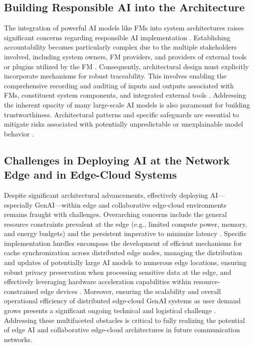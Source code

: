 \documentclass[sigconf]{acmart}
\begin{document}
\subsection{Building Responsible AI into the Architecture}

The integration of powerful AI models like FMs into system architectures raises significant concerns regarding responsible AI implementation \cite{ref16}. Establishing accountability becomes particularly complex due to the multiple stakeholders involved, including system owners, FM providers, and providers of external tools or plugins utilized by the FM \cite{ref16}. Consequently, architectural design must explicitly incorporate mechanisms for robust traceability. This involves enabling the comprehensive recording and auditing of inputs and outputs associated with FMs, constituent system components, and integrated external tools \cite{ref16}. Addressing the inherent opacity of many large-scale AI models is also paramount for building trustworthiness. Architectural patterns and specific safeguards are essential to mitigate risks associated with potentially unpredictable or unexplainable model behavior \cite{ref16}.

\subsection{Challenges in Deploying AI at the Network Edge and in Edge-Cloud Systems}

Despite significant architectural advancements, effectively deploying AI—especially GenAI—within edge and collaborative edge-cloud environments remains fraught with challenges. Overarching concerns include the general resource constraints prevalent at the edge (e.g., limited compute power, memory, and energy budgets) and the persistent imperative to minimize latency \cite{ref14,ref31}. Specific implementation hurdles encompass the development of efficient mechanisms for cache synchronization across distributed edge nodes, managing the distribution and updates of potentially large AI models to numerous edge locations, ensuring robust privacy preservation when processing sensitive data at the edge, and effectively leveraging hardware acceleration capabilities within resource-constrained edge devices \cite{ref3}. Moreover, ensuring the scalability and overall operational efficiency of distributed edge-cloud GenAI systems as user demand grows presents a significant ongoing technical and logistical challenge \cite{ref31}. Addressing these multifaceted obstacles is critical to fully realizing the potential of edge AI and collaborative edge-cloud architectures in future communication networks.
\end{document}
